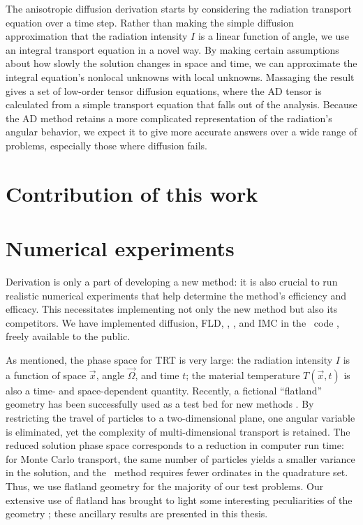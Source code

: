 The anisotropic diffusion derivation starts by considering the radiation
transport equation over a time step. Rather than
making the simple diffusion approximation that the radiation intensity $I$ is a
linear function of angle, we use an integral transport equation in a novel way.
By making certain assumptions about how slowly the solution changes in space
and time, we can approximate the integral equation's nonlocal unknowns
with local unknowns. Massaging the result gives a set of low-order tensor
diffusion equations, where the AD tensor is calculated from a simple transport
equation that falls out of the analysis. Because the AD method retains a more
complicated representation of the radiation's angular behavior, we expect it
to give more accurate answers over a wide range of problems, especially those
where diffusion fails.


\section{Contribution of this work}

\section{Numerical experiments}

Derivation is only a part of developing a new method: it is also
crucial to run realistic numerical experiments that help determine the method's
efficiency and efficacy. This necessitates implementing not only the new method
but also its competitors. We have implemented
diffusion, FLD, \Pone, \SN, and IMC in the \pytrt\ code \cite{Pytrt}, freely
available to the public.

As mentioned, the phase space for TRT is very large: the radiation intensity
$I$ is a function of space $\vec{x}$, angle $\vec{\Omega}$, and time $t$;
the material temperature $T(\vec{x},t)$ is also a time- and space-dependent
quantity. Recently, a fictional ``flatland'' geometry has been successfully
used as a test
bed for new methods \cite{Lar2009c,Joh2011,Tra2011}. By restricting the travel
of particles to a two-dimensional plane, one angular variable is eliminated,
yet the complexity of multi-dimensional transport is retained. The
reduced solution phase space corresponds to a reduction in computer run time:
for Monte Carlo transport, the same number of particles yields a smaller
variance in the solution, and the \SN\ method requires fewer ordinates in the
quadrature set. Thus, we use flatland geometry for the majority of our test
problems.
Our extensive use of flatland has brought to light some
interesting peculiarities of the geometry \cite{Joh2011a}; these ancillary
results are presented in this thesis.

